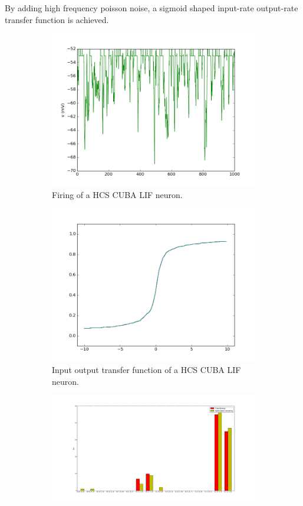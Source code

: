 By adding high frequency poisson noise, a sigmoid shaped input-rate output-rate transfer function is achieved.

\begin{figure}
	\centering
	\begin{subfigure}[t]{.5\textwidth}
  		\centering
  		\includegraphics[width=.8\linewidth]{imgs/cuba_lif_act.png}
  		\caption{Firing of a HCS CUBA LIF neuron.}
  		\label{fig:sub1}
	\end{subfigure}%
	\begin{subfigure}[t]{.5\textwidth}
  		\centering
  		\includegraphics[width=.8\linewidth]{imgs/cuba_lif_sigmoid.png}
  		\caption{Input output transfer function of a HCS CUBA LIF neuron.}
  		\label{fig:sub2}
	\end{subfigure}
	\begin{subfigure}[t]{.5\textwidth}
  		\centering
  		\includegraphics[width=.8\linewidth]{imgs/cuba_lif_bm.png}

\end{subfigure}
\end{figure}
